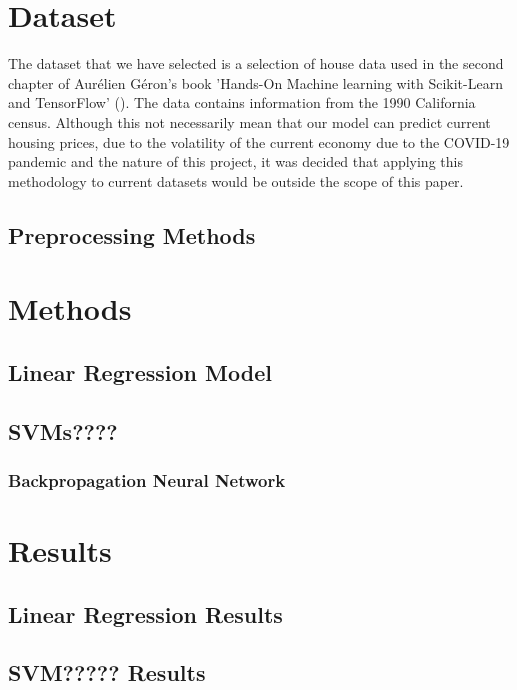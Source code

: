 \documentclass[11pt]{article}
\begin{document}
\section{Dataset}

The dataset that we have selected is a selection of house data used in the second chapter of Aurélien Géron's book 'Hands-On Machine learning with Scikit-Learn and TensorFlow'  (\citeyear{Geron2022}). The data contains information from the 1990 California census. Although this not necessarily mean that our model can predict current housing prices, due to the volatility of the current economy due to the COVID-19 pandemic and the nature of this project, it was decided that applying this methodology to current datasets would be outside the scope of this paper.

\subsection{Preprocessing Methods}



\section{Methods}

\subsection{Linear Regression Model}

\subsection{SVMs????}

\subsubsection{Backpropagation Neural Network}

\section{Results}

\subsection{Linear Regression Results}


\subsection{SVM????? Results}
\end{document}

